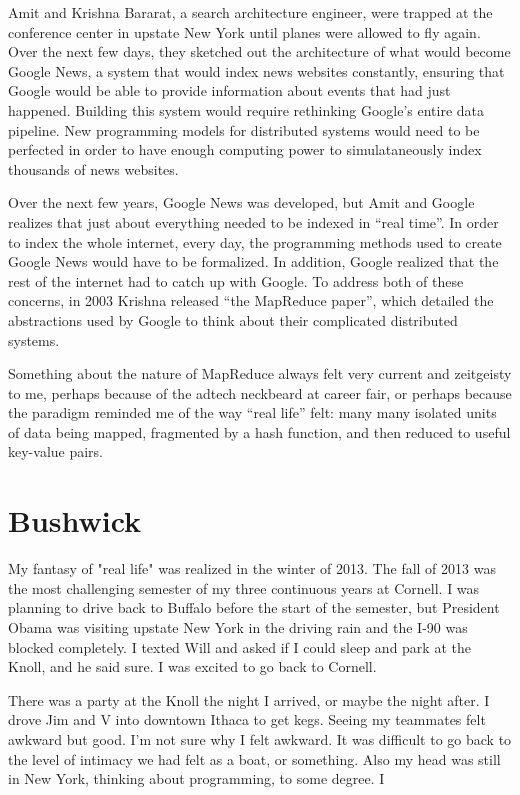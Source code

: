 \documentclass[12pt]{article}
\begin{document}
Amit and Krishna Bararat, a search architecture engineer, were trapped at the
conference center in upstate New York until planes were allowed to fly again.
Over the next few days, they sketched out the architecture of what would become
Google News, a system that would index news websites constantly, ensuring that
Google would be able to provide information about events that had just happened.
Building this system would require rethinking Google's entire data pipeline.
New programming models for distributed systems would need to be perfected in
order to have enough computing power to simulataneously index thousands of news
websites.

Over the next few years, Google News was developed, but Amit and Google realizes
that just about everything needed to be indexed in ``real time''.  In order to
index the whole internet, every day, the programming methods used to create
Google News would have to be formalized.  In addition, Google realized that the
rest of the internet had to catch up with Google.  To address both of these
concerns, in 2003 Krishna released ``the MapReduce paper'', which detailed the
abstractions used by Google to think about their complicated distributed
systems.  

Something about the nature of MapReduce always felt very current and zeitgeisty
to me, perhaps because of the adtech neckbeard at career fair, or perhaps
because the paradigm reminded me of the way ``real life'' felt: many many isolated
units of data being mapped, fragmented by a hash function, and then reduced to
useful key-value pairs.

\section{Bushwick}
My fantasy of "real life" was realized in the winter of 2013.  The fall of 2013
was the most challenging semester of my three continuous years at Cornell.  I
was planning to drive back to Buffalo before the start of the semester, but
President Obama was visiting upstate New York in the driving rain and the I-90
was blocked completely.  I texted Will and asked if I could sleep and park at the
Knoll, and he said sure.  I was excited to go back to Cornell.

There was a party at the Knoll the night I arrived, or maybe the night after.  I
drove Jim and V into downtown Ithaca to get kegs.  Seeing my teammates felt
awkward but good.  I'm not sure why I felt awkward.  It was difficult to go back
to the level of intimacy we had felt as a boat, or something.  Also my head was
still in New York, thinking about programming, to some degree.  I  
\end{document}
